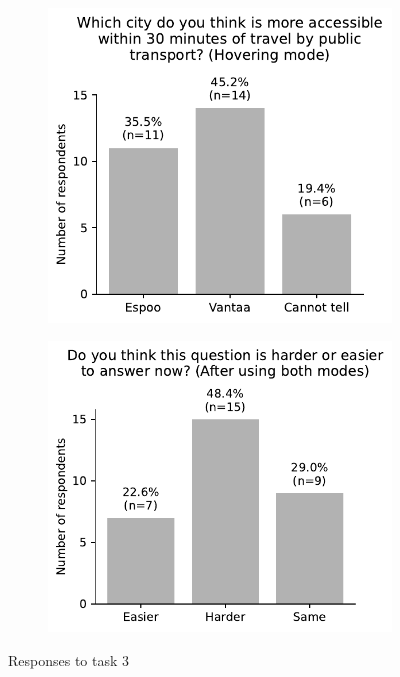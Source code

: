 \begin{appendices}
\begin{figure}[H]
	\begin{subfigure}[b]{0.5\textwidth}
		\includegraphics[width=\textwidth]{visual/figures/survey/3.pdf}
	\end{subfigure}%
	\hfill
	\begin{subfigure}[b]{0.5\textwidth}
		\includegraphics[width=\textwidth]{visual/figures/survey/4.pdf}
	\end{subfigure}%
	\newline
	Responses to task 3
\end{figure}


\end{appendices}
